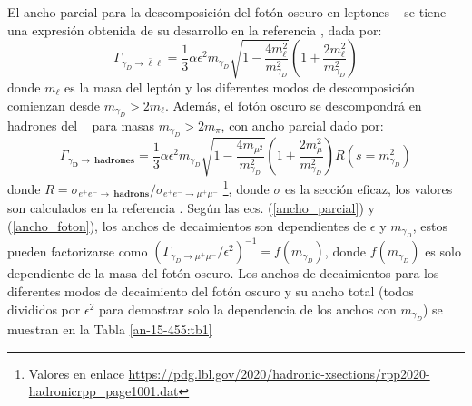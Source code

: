 El ancho parcial  para la descomposición del fotón oscuro en leptones \ME ~ se tiene una expresión obtenida de su desarrollo en la referencia \citep{foton_decae}, dada por:
\begin{equation}\label{ancho_parcial}
\Gamma_{\gamma_D \rightarrow \bar{\ell}\ell} = \dfrac{1}{3}\alpha \epsilon^2 m_{\gamma_D} \sqrt{1- \dfrac{4m_\ell^2}{m_{\gamma_D}^2}}
\left( 1 + \dfrac{2m_\ell^2}{m_{\gamma_D}^2}\right) 
\end{equation}
donde $m_\ell$ es la masa del leptón y los diferentes modos de descomposición comienzan desde $m_{\gamma_D} > 2 m_\ell$. Además, el fotón oscuro se descompondrá en hadrones del \ME ~ para masas $m_{\gamma_D} > 2 m_\pi$, con ancho parcial dado por:
\begin{equation}\label{ancho_foton}
\Gamma_{\gamma_\mathbf{D} \rightarrow ~ \mathbf{hadrones}}= \dfrac{1}{3} \alpha \epsilon^2 m_{\gamma_D} \sqrt{1 -\dfrac{4 m_{\mu^2}}{m_{\gamma_D}^2}} \left( 1 + \dfrac{2 m_\mu^2}{m_{\gamma_D}^2}\right) R(s = m_{\gamma_D}^2)
\end{equation}
donde $R = \sigma_{e^+ e^- \rightarrow ~ \mathbf{hadrons}} / \sigma_{e^+ e^- \rightarrow \mu^+ \mu^-}$ \footnote{Valores en enlace \href{https://pdg.lbl.gov/2020/hadronic-xsections/rpp2020-hadronicrpp\_page1001.dat}{https://pdg.lbl.gov/2020/hadronic-xsections/rpp2020-hadronicrpp\_page1001.dat}}, donde $\sigma$ es la sección eficaz, los valores son calculados en la referencia \cite{foton_decae}. %
Según las ecs. (\ref{ancho_parcial}) y (\ref{ancho_foton}), los anchos de decaimientos son dependientes de $\epsilon$ y $m_{\gamma_D}$, estos pueden factorizarse como $ (\Gamma_{\gamma_{D}{\rightarrow \mu^+\mu^-}}/\epsilon^2)^{-1}= f (m_{\gamma_D})$, donde $f (m_{\gamma_D})$ es solo dependiente de la masa del fotón oscuro. Los anchos de decaimientos para los diferentes modos de decaimiento del fotón oscuro y su ancho total (todos divididos por $\epsilon^2$ para demostrar solo la dependencia de los anchos con $m_{\gamma_D}$) se muestran en la Tabla \ref{an-15-455:tb1}%
